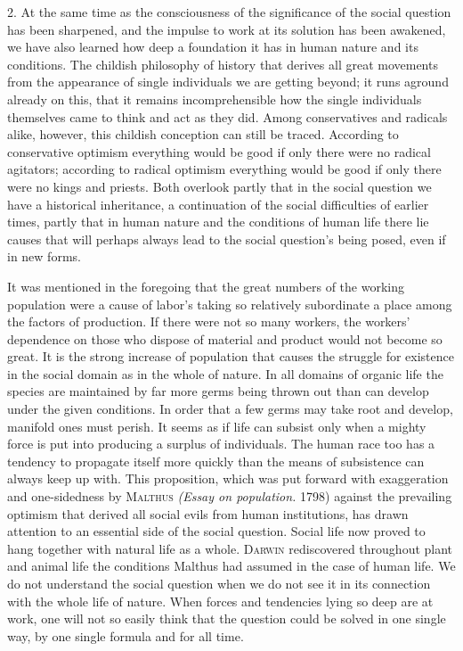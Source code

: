 \documentclass[12pt,a4paper,openany]{book}
\newcommand{\opage}[1]{\marginnote{\footnotesize\textit{[#1]}}}
\begin{document}
2. At the same time as the consciousness of the significance of the social question has been sharpened, and the impulse
to work at its solution has been awakened, we have also learned how deep a foundation it has in human nature and its
conditions. The childish philosophy of history that derives all great movements from the appearance of single individuals
we are getting beyond; it runs aground already on this, that it remains incomprehensible how the single individuals
themselves came to think and act as they did. Among conservatives and radicals alike, however, this childish conception
can still be traced. According to conservative optimism everything would be good if only there were no radical
agitators; according to radical optimism everything would be good if only there were no kings and priests. Both overlook
partly that in the social question we have a historical inheritance, a continuation of the social difficulties of earlier
times, partly that in human nature and the conditions of human life there lie causes that will perhaps always lead to the
social question's being posed, even if in new forms.

It was mentioned in the foregoing that the great numbers of the working population were a cause of labor's taking so
relatively subordinate a place among the factors of production. If there were not so many workers, the workers'
dependence on those who dispose of material and product would not become so great. It is the strong increase of
population that causes the struggle for existence in the social domain as in the whole of nature. In all domains of
organic life the species are maintained by far more germs being thrown out than can develop under the given conditions.
In order that a few germs may take root and develop, manifold ones must perish. It
\opage{367}seems as if life can subsist only when a mighty force is put into producing a surplus of individuals. The
human race too has a tendency to propagate itself more quickly than the means of subsistence can always keep up with.
This proposition, which was put forward with exaggeration and one-sidedness by \textsc{Malthus} \textit{(Essay on
population.} 1798) against the prevailing optimism that derived all social evils from human institutions, has drawn
attention to an essential side of the social question. Social life now proved to hang together with natural life as a
whole. \textsc{Darwin} rediscovered throughout plant and animal life the conditions Malthus had assumed in the case of
human life. We do not understand the social question when we do not see it in its connection with the whole life of
nature. When forces and tendencies lying so deep are at work, one will not so easily think that the question could be
solved in one single way, by one single formula and for all time.
\end{document}
